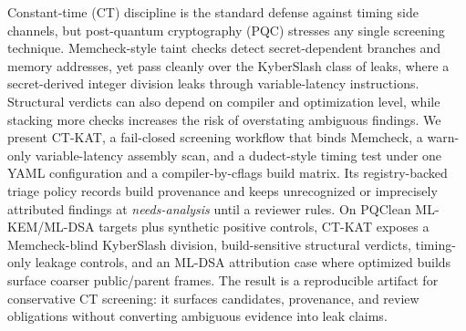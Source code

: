 Constant-time (CT) discipline is the standard defense against timing side
channels, but post-quantum cryptography (PQC) stresses any single screening
technique. Memcheck-style taint checks detect secret-dependent branches and
memory addresses, yet pass cleanly over the KyberSlash class of leaks, where a
secret-derived integer division leaks through variable-latency instructions.
Structural verdicts can also depend on compiler and optimization level, while
stacking more checks increases the risk of overstating ambiguous findings. We
present CT-KAT, a fail-closed screening
workflow that binds Memcheck, a warn-only variable-latency assembly scan, and a
dudect-style timing test under one YAML configuration and a compiler-by-cflags
build matrix. Its registry-backed triage policy records build provenance and
keeps unrecognized or imprecisely attributed findings at \emph{needs-analysis}
until a reviewer rules. On PQClean ML-KEM/ML-DSA targets plus synthetic positive
controls, CT-KAT exposes a Memcheck-blind KyberSlash division, build-sensitive
structural verdicts, timing-only leakage controls, and an ML-DSA attribution
case where optimized builds surface coarser public/parent frames. The result is
a reproducible artifact for conservative CT screening: it surfaces candidates,
provenance, and review obligations without converting ambiguous evidence into
leak claims.

